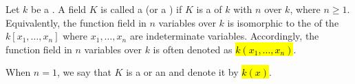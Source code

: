 \begin{definition} \label{definition:function_field_over_a_field}
Let $k$ be a . 
A field $K$ is called a  (or a ) if $K$ is a  of $k$ with  $n$ over $k$, where $n \geq 1$. Equivalently, the function field in $n$ variables over $k$ is isomorphic to the  of the  $k[x_1,\ldots,x_n]$ where $x_1,\ldots,x_n$ are indeterminate variables. Accordingly, the function field in $n$ variables over $k$ is often denoted as \hl{$k(x_1,\ldots,x_n)$}.

When $n = 1$, we say that $K$ is a  or an  and denote it by \hl{$k(x)$}.
\TextIfExists{}{}
\end{definition}